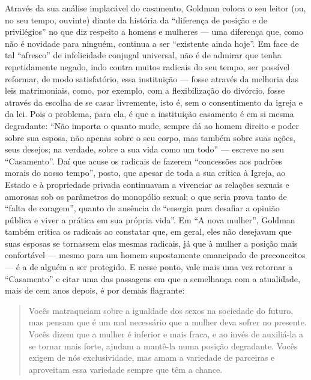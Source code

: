 Através da sua análise implacável do casamento, Goldman coloca o seu
leitor (ou, no seu tempo, ouvinte) diante da história da ``diferença de
posição e de privilégios'' no que diz respeito a homens e mulheres ---
uma diferença que, como não é novidade para ninguém, continua a ser
``existente ainda hoje''. Em face de tal ``afresco'' de infelicidade
conjugal universal, não é de admirar que tenha repetidamente negado,
indo contra muitos radicais do seu tempo, ser possível reformar, de modo
satisfatório, essa instituição --- fosse através da melhoria das leis
matrimoniais, como, por exemplo, com a flexibilização do divórcio, fosse
através da escolha de se casar livremente, isto é, sem o consentimento
da igreja e da lei. Pois o problema, para ela, é que a instituição
casamento é em si mesma degradante: ``Não importa o quanto mude, sempre
dá ao homem direito e poder sobre sua esposa, não apenas sobre o seu
corpo, mas também sobre suas ações, seus desejos; na verdade, sobre a
sua vida como um todo'' --- escreve no seu ``Casamento''. Daí que acuse
os radicais de fazerem ``concessões aos padrões morais do nosso tempo'',
posto, que apesar de toda a sua crítica à Igreja, ao Estado e à
propriedade privada continuavam a vivenciar as relações sexuais e
amorosas sob os parâmetros do monopólio sexual; o que seria prova tanto
de ``falta de coragem'', quanto de ausência de ``energia para desafiar a
opinião pública e viver a prática em sua própria vida''. Em ``A nova
mulher'', Goldman também critica os radicais ao constatar que, em geral,
eles não desejavam que suas esposas se tornassem elas mesmas radicais,
já que à mulher a posição mais confortável --- mesmo para um homem
supostamente emancipado de preconceitos --- é a de alguém a ser
protegido. E nesse ponto, vale mais uma vez retornar a ``Casamento'' e
citar uma das passagens em que a semelhança com a atualidade, mais de
cem anos depois, é por demais flagrante:

\begin{quote}
Vocês matraqueiam sobre a igualdade dos sexos na sociedade do futuro,
mas pensam que é um mal necessário que a mulher deva sofrer no presente.
Vocês dizem que a mulher é inferior e mais fraca, e ao invés de
auxiliá-la a se tornar mais forte, ajudam a mantê-la numa posição
degradante. Vocês exigem de nós exclusividade, mas amam a variedade de
parceiras e aproveitam essa variedade sempre que têm a chance.
\end{quote}


